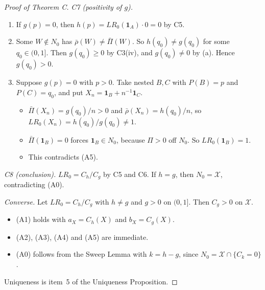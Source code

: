 \begin{proof}[Proof of Theorem C]
\emph{C7 (positivity of $g$).}
\begin{enumerate}
\item[(a)] If $g(p)=0$, then $h(p)=LR_0(\mathbf 1_A)\cdot0=0$ by C5.
\item[(b)] Some $W\notin N_0$ has $\bar\rho(W)\neq\bar\Pi(W)$. So $h(q_0)\neq g(q_0)$ for some $q_0\in(0,1]$. Then $g(q_0)\ge0$ by C3(iv), and $g(q_0)\ne0$ by (a). Hence $g(q_0)>0$.
\item[(c)] Suppose $g(p)=0$ with $p>0$. Take nested $B,C$ with $P(B)=p$ and $P(C)=q_0$, and put $X_n=\mathbf 1_B+n^{-1}\mathbf 1_C$.
  \begin{itemize}
  \item $\bar\Pi(X_n)=g(q_0)/n>0$ and $\bar\rho(X_n)=h(q_0)/n$, so $LR_0(X_n)=h(q_0)/g(q_0)\neq1$.
  \item $\bar\Pi(\mathbf 1_B)=0$ forces $\mathbf 1_B\in N_0$, because $\Pi>0$ off $N_0$. So $LR_0(\mathbf 1_B)=1$.
  \item This contradicts (A5).
  \end{itemize}
\end{enumerate}

\emph{C8 (conclusion).} $LR_0=C_h/C_g$ by C5 and C6. If $h=g$, then $N_0=\mathcal X$, contradicting (A0).

\emph{Converse.} Let $LR_0=C_h/C_g$ with $h\ne g$ and $g>0$ on $(0,1]$. Then $C_g>0$ on $\mathcal X$.
\begin{itemize}
\item (A1) holds with $a_X=C_h(X)$ and $b_X=C_g(X)$.
\item (A2), (A3), (A4) and (A5) are immediate.
\item (A0) follows from the Sweep Lemma with $k=h-g$, since $N_0=\mathcal X\cap\{C_k=0\}$.
\end{itemize}
Uniqueness is item~5 of the Uniqueness Proposition.
\end{proof}

